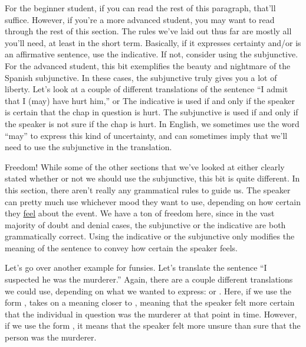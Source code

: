 For the beginner student, if you can read the rest of this paragraph, that'll suffice. However, if you're a more advanced student, you may want to read through the rest of this section. The rules we've laid out thus far are mostly all you'll need, at least in the short term. Basically, if it expresses certainty and/or is an affirmative sentence, use the indicative. If not, consider using the subjunctive. \\

For the advanced student, this bit exemplifies the beauty and nightmare of the Spanish subjunctive. In these cases, the subjunctive truly gives you a lot of liberty. Let's look at a couple of different translations of the sentence ``I admit that I (may) have hurt him,''  or  The indicative is used if and only if the speaker is certain that the chap in question is hurt. The subjunctive is used if and only if the speaker is not sure if the chap is hurt. In English, we sometimes use the word ``may'' to express this kind of uncertainty, and can sometimes imply that we'll need to use the subjunctive in the translation.

\begin{conf}{Freedom!}
	While some of the other sections that we've looked at either clearly stated whether or not we should use the subjunctive, this bit is quite different. In this section, there aren't really any grammatical rules to guide us. The speaker can pretty much use whichever mood they want to use, depending on how certain they \underline{feel} about the event. We have a ton of freedom here, since in the vast majority of doubt and denial cases, the subjunctive or the indicative are both grammatically correct. Using the indicative or the subjunctive only modifies the meaning of the sentence to convey how certain the speaker feels. 
\end{conf}

Let's go over another example for funsies. Let's translate the sentence ``I suspected he was the murderer.'' Again, there are a couple different translations we could use, depending on what we wanted to express:  or . Here, if we use the form ,  takes on a meaning closer to , meaning that the speaker felt more certain that the individual in question was the murderer at that point in time. However, if we use the form , it means that the speaker felt more unsure than sure that the person was the murderer.\\ 

